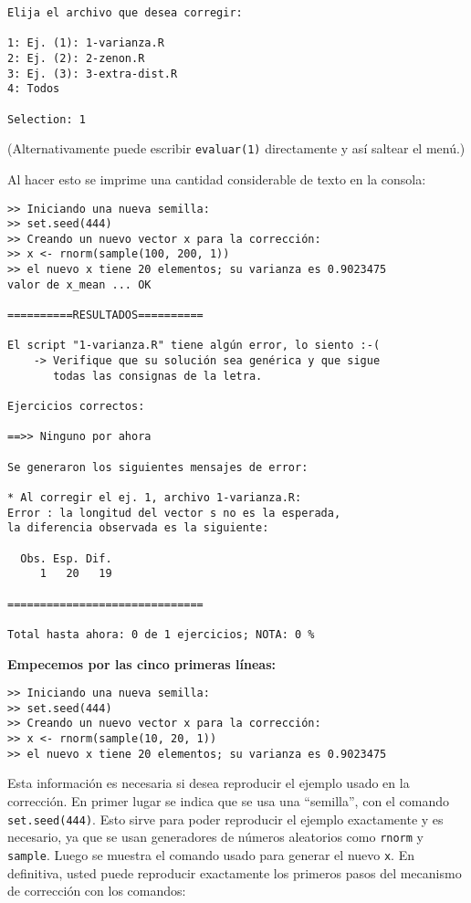 \documentclass[]{article}
\begin{document}
\begin{verbatim}
Elija el archivo que desea corregir: 

1: Ej. (1): 1-varianza.R
2: Ej. (2): 2-zenon.R
3: Ej. (3): 3-extra-dist.R
4: Todos

Selection: 1
\end{verbatim}
(Alternativamente puede escribir \texttt{evaluar(1)} directamente y así
saltear el menú.)

Al hacer esto se imprime una cantidad considerable de texto en la
consola:

\begin{verbatim}
>> Iniciando una nueva semilla:
>> set.seed(444)
>> Creando un nuevo vector x para la corrección:
>> x <- rnorm(sample(100, 200, 1))
>> el nuevo x tiene 20 elementos; su varianza es 0.9023475
valor de x_mean ... OK

==========RESULTADOS==========

El script "1-varianza.R" tiene algún error, lo siento :-(
    -> Verifique que su solución sea genérica y que sigue
       todas las consignas de la letra. 

Ejercicios correctos:

==>> Ninguno por ahora

Se generaron los siguientes mensajes de error:

* Al corregir el ej. 1, archivo 1-varianza.R:
Error : la longitud del vector s no es la esperada,
la diferencia observada es la siguiente:

  Obs. Esp. Dif. 
     1   20   19 

==============================

Total hasta ahora: 0 de 1 ejercicios; NOTA: 0 % 
\end{verbatim}
\textbf{Empecemos por las cinco primeras líneas:}

\begin{verbatim}
>> Iniciando una nueva semilla:
>> set.seed(444)
>> Creando un nuevo vector x para la corrección:
>> x <- rnorm(sample(10, 20, 1))
>> el nuevo x tiene 20 elementos; su varianza es 0.9023475
\end{verbatim}
Esta información es necesaria si desea reproducir el ejemplo usado en la
corrección. En primer lugar se indica que se usa una ``semilla'', con el
comando \texttt{set.seed(444)}. Esto sirve para poder reproducir el
ejemplo exactamente y es necesario, ya que se usan generadores de
números aleatorios como \texttt{rnorm} y \texttt{sample}. Luego se
muestra el comando usado para generar el nuevo \texttt{x}. En
definitiva, usted puede reproducir exactamente los primeros pasos del
mecanismo de corrección con los comandos:
\end{document}
